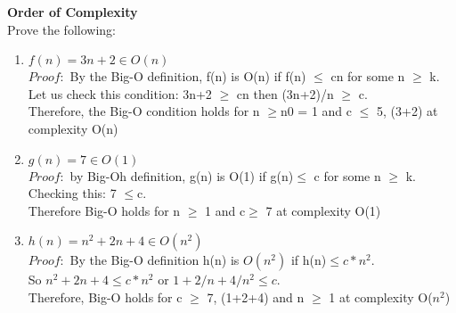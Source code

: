 \documentclass[12pt]{article}
\begin{document}
\textbf{Order of Complexity}\\
\indent Prove the following:\\
\begin{enumerate}
\item 
$f(n) = 3n + 2 \in O(n)$\\
$Proof:$ By the Big-O definition, f(n) is O(n) if f(n) $\leq$ cn
 for some n $\geq$ k.\\ Let us check this condition: 3n+2 $\geq$ cn then (3n+2)/n $\geq$ c.\\ Therefore, the Big-O condition holds for n $\geq $n0 = 1 and c $\leq$ 5, (3+2) at complexity O(n)
\item
$g(n) = 7 \in O(1)$\\
$Proof:$ by Big-Oh definition, g(n) is O(1) if g(n)$\leq$ c for some n $\geq$ k.\\ Checking this: 7 $\leq$c.\\ Therefore Big-O holds for n $\geq$ 1 and c$\geq$ 7 at complexity O(1)
\item
$h(n) =n^2+ 2n+ 4\in O(n^2)$\\
$Proof:$ By the Big-O definition h(n)  is $O(n^2)$ if h(n)$\leq c*n^2$.\\ So $n^2+2n+4 \leq c*n^2$ or $1+2/n+4/n^2 \leq c$.\\ Therefore, Big-O holds for c $\geq$ 7, (1+2+4) and  n $\geq$ 1 at complexity O($n^2$)

\end{enumerate}
\end{document}
